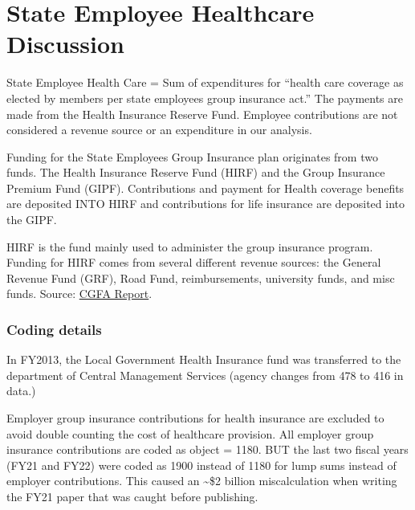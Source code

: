 \documentclass[
  letterpaper,
  DIV=11,
  numbers=noendperiod]{scrreport}
\begin{document}

\hypertarget{state-employee-healthcare-discussion}{%
\chapter{State Employee Healthcare
Discussion}\label{state-employee-healthcare-discussion}}

State Employee Health Care = Sum of expenditures for ``health care
coverage as elected by members per state employees group insurance
act.'' The payments are made from the Health Insurance Reserve Fund.
Employee contributions are not considered a revenue source or an
expenditure in our analysis.

Funding for the State Employees Group Insurance plan originates from two
funds. The Health Insurance Reserve Fund (HIRF) and the Group Insurance
Premium Fund (GIPF). Contributions and payment for Health coverage
benefits are deposited INTO HIRF and contributions for life insurance
are deposited into the GIPF.

HIRF is the fund mainly used to administer the group insurance program.
Funding for HIRF comes from several different revenue sources: the
General Revenue Fund (GRF), Road Fund, reimbursements, university funds,
and misc funds. Source:
\href{https://cgfa.ilga.gov/Upload/fy2011stateemployees\textquotesingle{}groupinsurance.pdf}{CGFA
Report}.

\hypertarget{coding-details-1}{%
\subsection{\texorpdfstring{\textbf{Coding
details}}{Coding details}}\label{coding-details-1}}

In FY2013, the Local Government Health Insurance fund was transferred to
the department of Central Management Services (agency changes from 478
to 416 in data.)

Employer group insurance contributions for health insurance are excluded
to avoid double counting the cost of healthcare provision. All employer
group insurance contributions are coded as object = 1180. BUT the last
two fiscal years (FY21 and FY22) were coded as 1900 instead of 1180 for
lump sums instead of employer contributions. This caused an
\textasciitilde\$2 billion miscalculation when writing the FY21 paper
that was caught before publishing.
\end{document}
